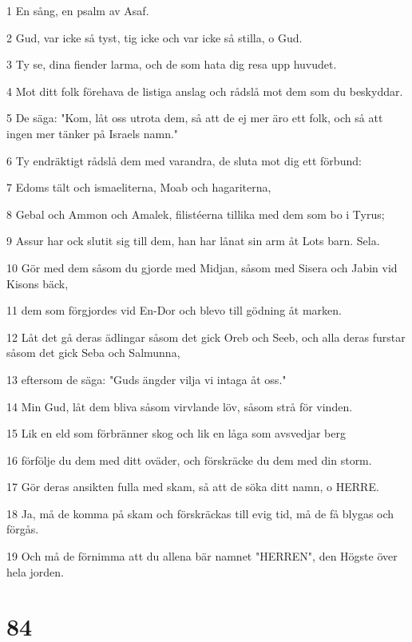 \par 1 En sång, en psalm av Asaf.
\par 2 Gud, var icke så tyst, tig icke och var icke så stilla, o Gud.
\par 3 Ty se, dina fiender larma, och de som hata dig resa upp huvudet.
\par 4 Mot ditt folk förehava de listiga anslag och rådslå mot dem som du beskyddar.
\par 5 De säga: "Kom, låt oss utrota dem, så att de ej mer äro ett folk, och så att ingen mer tänker på Israels namn."
\par 6 Ty endräktigt rådslå dem med varandra, de sluta mot dig ett förbund:
\par 7 Edoms tält och ismaeliterna, Moab och hagariterna,
\par 8 Gebal och Ammon och Amalek, filistéerna tillika med dem som bo i Tyrus;
\par 9 Assur har ock slutit sig till dem, han har lånat sin arm åt Lots barn. Sela.
\par 10 Gör med dem såsom du gjorde med Midjan, såsom med Sisera och Jabin vid Kisons bäck,
\par 11 dem som förgjordes vid En-Dor och blevo till gödning åt marken.
\par 12 Låt det gå deras ädlingar såsom det gick Oreb och Seeb, och alla deras furstar såsom det gick Seba och Salmunna,
\par 13 eftersom de säga: "Guds ängder vilja vi intaga åt oss."
\par 14 Min Gud, låt dem bliva såsom virvlande löv, såsom strå för vinden.
\par 15 Lik en eld som förbränner skog och lik en låga som avsvedjar berg
\par 16 förfölje du dem med ditt oväder, och förskräcke du dem med din storm.
\par 17 Gör deras ansikten fulla med skam, så att de söka ditt namn, o HERRE.
\par 18 Ja, må de komma på skam och förskräckas till evig tid, må de få blygas och förgås.
\par 19 Och må de förnimma att du allena bär namnet "HERREN", den Högste över hela jorden.

\chapter{84}

